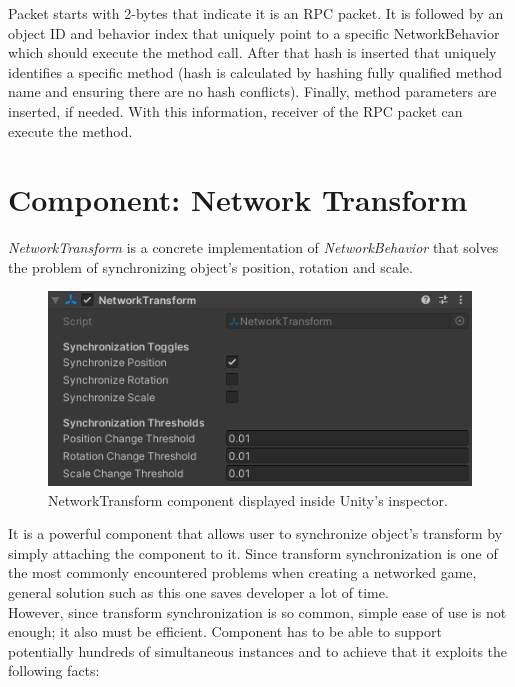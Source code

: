 \documentclass[times, utf8, diplomski]{fer}
\begin{document}
Packet starts with 2-bytes that indicate it is an RPC packet. It is followed by an object ID and behavior index that uniquely point to a specific NetworkBehavior which should execute the method call. After that hash is inserted that uniquely identifies a specific method (hash is calculated by hashing fully qualified method name and ensuring there are no hash conflicts). Finally, method parameters are inserted, if needed. With this information, receiver of the RPC packet can execute the method.

\section{Component: Network Transform}
\textit{NetworkTransform} is a concrete implementation of \textit{NetworkBehavior} that solves the problem of synchronizing object's position, rotation and scale.

\begin{figure}[H]
	\centering
	\includegraphics[scale=1.1]{NetworkTransform-inspector}
	\caption{NetworkTransform component displayed inside Unity's inspector.}
\end{figure}

It is a powerful component that allows user to synchronize object's transform by simply attaching the component to it. Since transform synchronization is one of the most commonly encountered problems when creating a networked game, general solution such as this one saves developer a lot of time.\\

However, since transform synchronization is so common, simple ease of use is not enough; it also must be efficient. Component has to be able to support potentially hundreds of simultaneous instances and to achieve that it exploits the following facts:
\end{document}

